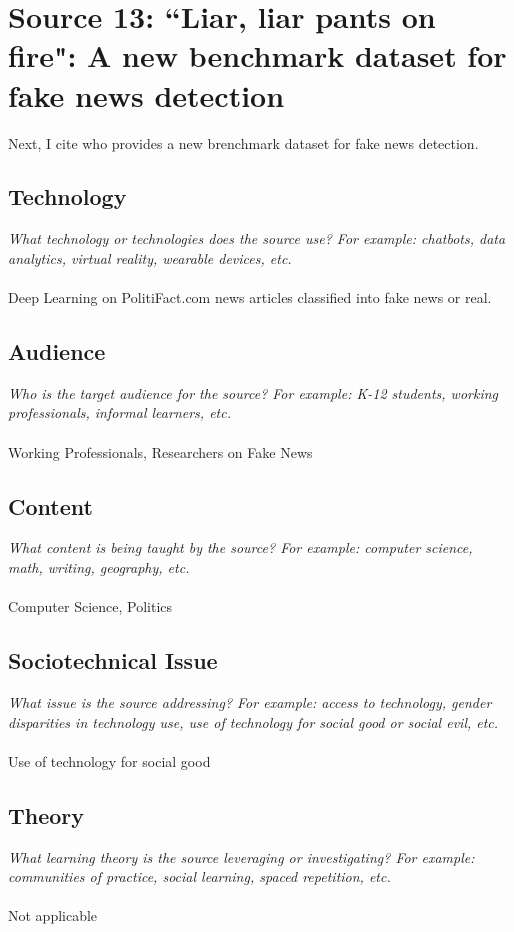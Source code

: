 \documentclass[12pt, final]{article}
\begin{document}
\section{Source 13: ``Liar, liar pants on fire": A new benchmark dataset for fake news detection}
\label{Source 13}

Next, I cite \cite{Wang} who provides a new brenchmark dataset for fake news detection.

\subsection{Technology}
\textit{What technology or technologies does the source use? For example: chatbots, data analytics, virtual reality, wearable devices, etc.}
\\
\\
Deep Learning on PolitiFact.com news articles classified into fake news or real.

\subsection{Audience}
\textit{Who is the target audience for the source? For example: K-12 students, working professionals, informal learners, etc.}
\\
\\
Working Professionals, Researchers on Fake News

\subsection{Content}
\textit{What content is being taught by the source? For example: computer science, math, writing, geography, etc.}
\\
\\
Computer Science, Politics

\subsection{Sociotechnical Issue}
\textit{What issue is the source addressing? For example: access to technology, gender disparities in technology use, use of technology for social good or social evil, etc.}
\\
\\
Use of technology for social good

\subsection{Theory}
\textit{What learning theory is the source leveraging or investigating? For example: communities of practice, social learning, spaced repetition, etc.}
\\
\\
Not applicable
\end{document}
